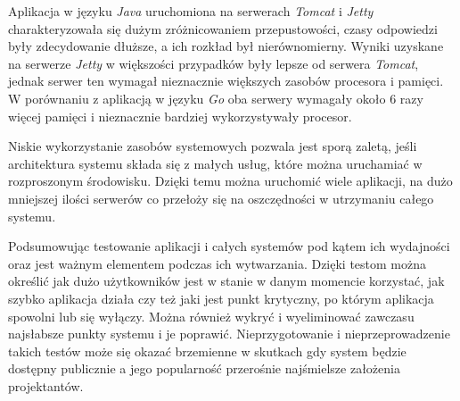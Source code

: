 Aplikacja w języku \textsl{Java} uruchomiona na serwerach \textsl{Tomcat} i \textsl{Jetty} charakteryzowała się dużym zróżnicowaniem przepustowości, czasy odpowiedzi były zdecydowanie dłuższe, a ich rozkład był nierównomierny. Wyniki uzyskane na serwerze \textsl{Jetty} w większości przypadków były lepsze od serwera \textsl{Tomcat}, jednak serwer ten wymagał nieznacznie większych zasobów procesora  i pamięci. W porównaniu z aplikacją w języku \textsl{Go} oba serwery wymagały około 6 razy więcej pamięci i nieznacznie bardziej wykorzystywały procesor.

Niskie wykorzystanie zasobów systemowych pozwala jest sporą zaletą, jeśli architektura systemu składa się z małych usług, które można uruchamiać w rozproszonym środowisku. Dzięki temu można uruchomić wiele aplikacji, na dużo mniejszej ilości serwerów co przełoży się na oszczędności w utrzymaniu całego systemu. 

Podsumowując testowanie aplikacji i całych systemów pod kątem ich wydajności oraz jest ważnym elementem podczas ich wytwarzania. Dzięki testom można określić jak dużo użytkowników jest w stanie w danym momencie korzystać, jak szybko aplikacja działa czy też jaki jest punkt krytyczny, po którym aplikacja spowolni lub się wyłączy. Można również wykryć i wyeliminować zawczasu najsłabsze punkty systemu i je poprawić. Nieprzygotowanie i nieprzeprowadzenie takich testów może się okazać brzemienne w skutkach gdy system będzie dostępny publicznie a jego popularność przerośnie najśmielsze założenia projektantów.

